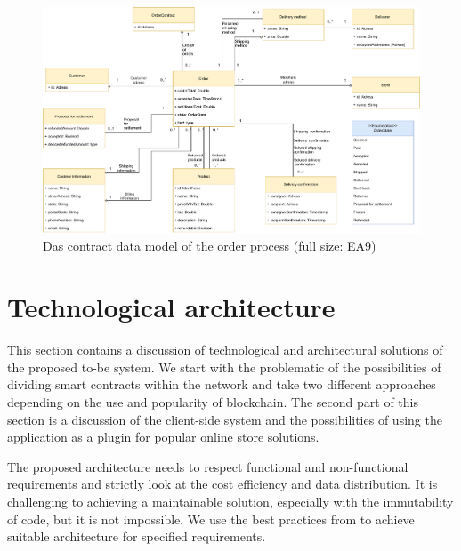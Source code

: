 \documentclass[thesis=M,english]{FITthesis}[2019/12/23]
\begin{document}
\begin{figure}[ht!]
    \centering
    \includegraphics[width=\textwidth]{assets/DataModel.pdf}
    \caption{Das contract data model of the order process  (full size: EA9)} %
    \label{fig:dataModel}
\end{figure}




\section{Technological architecture}

% 

This section contains a discussion of technological and architectural solutions of the proposed to-be system. We start with the problematic of the possibilities of dividing smart contracts within the network and take two different approaches depending on the use and popularity of blockchain. The second part of this section is a discussion of the client-side system and the possibilities of using the application as a plugin for popular online store solutions.

The proposed architecture needs to respect functional and non-functional requirements and strictly look at the cost efficiency and data distribution. It is challenging to achieving a maintainable solution, especially with the immutability of code, but it is not impossible. We use the best practices from \cite{smartContractUpgradeble} to achieve suitable architecture for specified requirements. 
\end{document}
